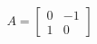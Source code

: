 \documentclass[preview]{standalone}
\begin{document}
\begin{align*}
A = \begin{bmatrix} 0 & -1 \\ 1 & 0 \end{bmatrix}
\end{align*}
\end{document}
